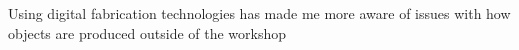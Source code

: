 Using digital fabrication technologies has made me more aware of issues with how objects are produced outside of the workshop